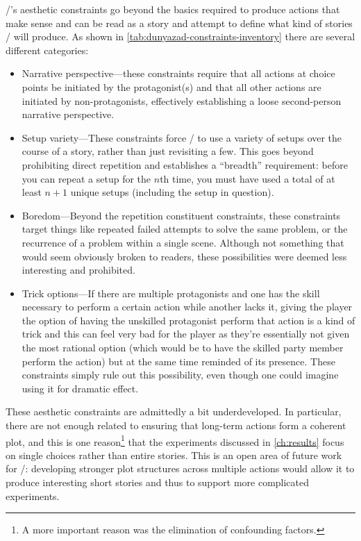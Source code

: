 \dunyazad/'s aesthetic constraints go beyond the basics required to produce actions that make sense and can be read as a story and attempt to define what kind of stories \dunyazad/ will produce.
%
As shown in \cref{tab:dunyazad-constraints-inventory} there are several different categories:
%
\begin{itemize}
  \item Narrative perspective---these constraints require that all actions at choice points be initiated by the protagonist(s) and that all other actions are initiated by non-protagonists, effectively establishing a loose second-person narrative perspective.
  \item Setup variety---These constraints force \dunyazad/ to use a variety of setups over the course of a story, rather than just revisiting a few. This goes beyond prohibiting direct repetition and establishes a ``breadth'' requirement: before you can repeat a setup for the $n$th time, you must have used a total of at least $n+1$ unique setups (including the setup in question).
  \item Boredom---Beyond the repetition constituent constraints, these constraints target things like repeated failed attempts to solve the same problem, or the recurrence of a problem within a single scene. Although not something that would seem obviously broken to readers, these possibilities were deemed less interesting and prohibited.
  \item Trick options---If there are multiple protagonists and one has the skill necessary to perform a certain action while another lacks it, giving the player the option of having the unskilled protagonist perform that action is a kind of trick and this can feel very bad for the player as they're essentially not given the most rational option (which would be to have the skilled party member perform the action) but at the same time reminded of its presence. These constraints simply rule out this possibility, even though one could imagine using it for dramatic effect.
\end{itemize}


These aesthetic constraints are admittedly a bit underdeveloped.
%
In particular, there are not enough related to ensuring that long-term actions form a coherent plot, and this is one reason\footnote{A more important reason was the elimination of confounding factors.} that the experiments discussed in \cref{ch:results} focus on single choices rather than entire stories.
%
This is an open area of future work for \dunyazad/: developing stronger plot structures across multiple actions would allow it to produce interesting short stories and thus to support more complicated experiments.

